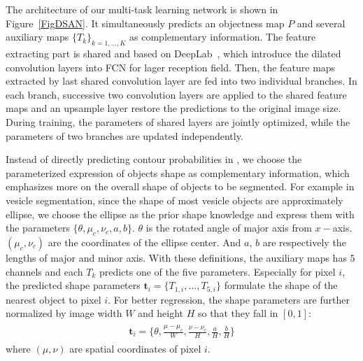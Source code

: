 The architecture of our multi-task learning network is shown in Figure~\ref{FigDSAN}.
It simultaneously predicts an objectness map $P$ and several auxiliary maps $\{T_k\}_{k=1,\ldots,K}$ as complementary information.
The feature extracting part is shared and based on DeepLab~\cite{Chen2014a}, which introduce the dilated convolution layers into FCN for lager reception field.
Then, the feature maps extracted by last shared convolution layer are fed into two individual branches.
In each branch, successive two convolution layers are applied to the shared feature maps and an upsample layer restore the predictions to the original image size.
During training, the parameters of shared layers are jointly optimized, while the parameters of two branches are updated independently.

Instead of directly predicting contour probabilities in \cite{Chen2017,Chen2016,Bertasius2016}, we choose the parameterized expression of objects shape as complementary information, which emphasizes more on the overall shape of objects to be segmented.
For example in vesicle segmentation, since the shape of most vesicle objects are approximately ellipse, we choose the ellipse as the prior shape knowledge and express them with the parameters $\{\theta, \mu_c, \nu_c, a, b\}$.
$\theta$ is the rotated angle of major axis from $x-$axis.
$(\mu_c, \nu_c)$ are the coordinates of the ellipse center.
And $a$, $b$ are respectively the lengths of major and minor axis.
With these definitions, the auxiliary maps has $5$ channels and each $T_k$ predicts one of the five parameters.
Especially for pixel $i$, the predicted shape parameters $\mathbf{t}_i= \{T_{1,i},\ldots,T_{5,i}\}$ formulate the shape of the nearest object to pixel $i$.
For better regression, the shape parameters are further normalized by image width $W$ and height $H$ so that they fall in $[0,1]$:
\begin{eqnarray}\label{EqPara}
\begin{aligned}
\mathbf{t}_{i} = \{\theta,\frac{\mu-\mu_c}{W},\frac{\nu-\nu_c}{H},\frac{a}{H},\frac{b}{H}\}
\end{aligned}
\end{eqnarray}
where $(\mu, \nu)$ are spatial coordinates of pixel $i$.

